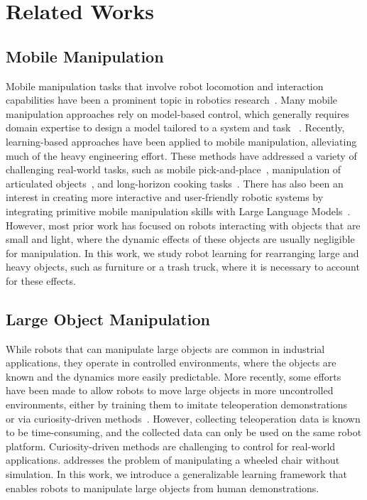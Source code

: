 \section{Related Works}


\subsection{Mobile Manipulation}

Mobile manipulation tasks that involve robot locomotion and interaction capabilities have been a prominent topic in robotics research~\citep{MobileAloha, TidyBot, Naoki_ASC, Behavior, Habitat, mittal2022articulated, DeepWholeBody, RT1, SayCan}. Many mobile manipulation approaches rely on model-based control, which generally requires domain expertise to design a model tailored to a system and task
~\citep{krotkov2018darpa, wyrobek2008towards, khatib1996force, garrett2021integrated}. 
Recently, learning-based approaches have been applied to mobile manipulation, alleviating much of the heavy engineering effort. These methods have addressed a variety of challenging real-world tasks, such as mobile pick-and-place~\citep{Naoki_ASC, sun2022fully, Homerobot, ha2024umi}, manipulation of articulated objects~\citep{xiong2024adaptive, shafiullah2023bringing, yang2023moma}, and long-horizon cooking tasks~\citep{MobileAloha}. There has also been an interest in creating more interactive and user-friendly robotic systems by integrating primitive mobile manipulation skills with Large Language Models~\citep{TidyBot, RT1, SayCan}. However, most prior work has focused on robots interacting with objects that are small and light, where the dynamic effects of these objects are usually negligible for manipulation. In this work, we study robot learning for rearranging large and heavy objects, such as furniture or a trash truck, where it is necessary to account for these effects.



\subsection{Large Object Manipulation}

While robots that can manipulate large objects are common in industrial applications, they operate in controlled environments, where the objects are known and the dynamics more easily predictable. More recently, some efforts have been made to allow robots to move large objects in more uncontrolled environments, either by training them to imitate teleoperation demonstrations~\citep{MobileAloha} or via curiosity-driven methods~\citep{mendonca2024continuously}. However, collecting teleoperation data is known to be time-consuming, and the collected data can only be used on the same robot platform. Curiosity-driven methods are challenging to control for real-world applications. \citet{ravan2024combining} addresses the problem of manipulating a wheeled chair without simulation. In this work, we introduce a generalizable learning framework that enables robots to manipulate large objects from human demonstrations.







